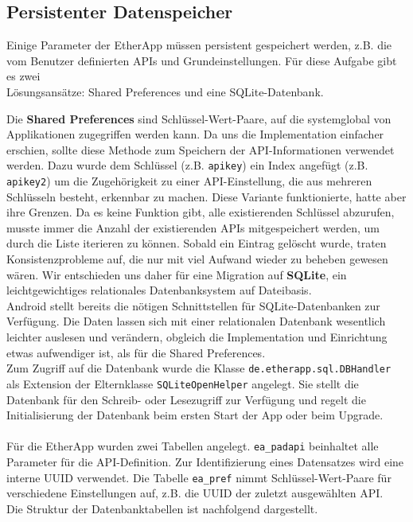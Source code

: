 \subsection{Persistenter Datenspeicher}
Einige Parameter der EtherApp müssen persistent gespeichert werden, z.B. die vom Benutzer definierten APIs und Grundeinstellungen.
Für diese Aufgabe gibt es zwei\\
Lösungsansätze: Shared Preferences und eine SQLite-Datenbank.

Die \textbf{Shared Preferences} sind Schlüssel-Wert-Paare, auf die systemglobal von Applikationen zugegriffen werden kann.
Da uns die Implementation einfacher erschien, sollte diese Methode zum Speichern der API-Informationen verwendet werden.
Dazu wurde dem Schlüssel (z.B. \texttt{apikey}) ein Index angefügt (z.B. \texttt{apikey2}) um die Zugehörigkeit zu einer API-Einstellung, die aus mehreren Schlüsseln besteht, erkennbar zu machen.
Diese Variante funktionierte, hatte aber ihre Grenzen.
Da es keine Funktion gibt, alle existierenden Schlüssel abzurufen, musste immer die Anzahl der existierenden APIs mitgespeichert werden, um durch die Liste iterieren zu können.
Sobald ein Eintrag gelöscht wurde, traten Konsistenzprobleme auf, die nur mit viel Aufwand wieder zu beheben gewesen wären.
Wir entschieden uns daher für eine Migration auf \textbf{SQLite}, ein leichtgewichtiges relationales Datenbanksystem auf Dateibasis.\\
Android stellt bereits  die nötigen Schnittstellen für SQLite-Datenbanken zur Verfügung.
Die Daten lassen sich mit einer relationalen Datenbank wesentlich leichter auslesen und verändern, obgleich die Implementation und Einrichtung etwas aufwendiger ist, als für die Shared Preferences.\\
Zum Zugriff auf die Datenbank wurde die Klasse \texttt{de.etherapp.sql.DBHandler} als Extension der Elternklasse \texttt{SQLiteOpenHelper} angelegt.
Sie stellt die Datenbank für den Schreib- oder Lesezugriff zur Verfügung und regelt die Initialisierung der Datenbank beim ersten Start der App oder beim Upgrade.\\
\\
Für die EtherApp wurden zwei Tabellen angelegt.
\texttt{ea\_padapi} beinhaltet alle Parameter für die API-Definition.
Zur Identifizierung eines Datensatzes wird eine interne UUID verwendet.
Die Tabelle \texttt{ea\_pref} nimmt Schlüssel-Wert-Paare für verschiedene Einstellungen auf, z.B. die UUID der zuletzt ausgewählten API.\\
Die Struktur der Datenbanktabellen ist nachfolgend dargestellt.

